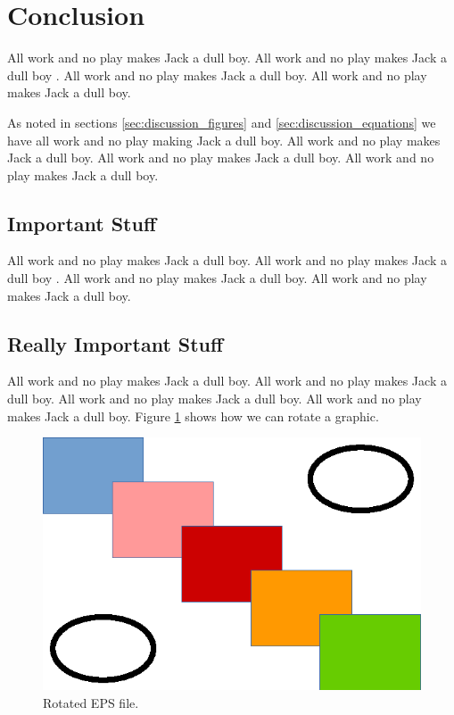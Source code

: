 
%
%

%
%

\section{Conclusion}
\label{sec:conclusion}

All work and no play makes Jack a dull boy.
All work and no play makes Jack a dull boy \cite{knuth-website}.
All work and no play makes Jack a dull boy.
All work and no play makes Jack a dull boy.

As noted in sections
\ref{sec:discussion_figures} and
\ref{sec:discussion_equations}
we have all work and no play making Jack a dull boy.
All work and no play makes Jack a dull boy.
All work and no play makes Jack a dull boy.
All work and no play makes Jack a dull boy.

\subsection{Important Stuff}
\label{sec:conclusions_important_stuff}

All work and no play makes Jack a dull boy.
All work and no play makes Jack a dull boy
\cite{einstein-electrodynamics,
knuth-website,
knuth-fundamental-algorithms,
dirac-quantum-mechanics}.
All work and no play makes Jack a dull boy.
All work and no play makes Jack a dull boy.

\subsection{Really Important Stuff}
\label{sec:conclusions_really_important_stuff}

All work and no play makes Jack a dull boy.
All work and no play makes Jack a dull boy.
All work and no play makes Jack a dull boy.
All work and no play makes Jack a dull boy.
Figure \ref{fig:rotated_shapes} shows how we can rotate a graphic.

\begin{figure}[h]
\centering
\includegraphics[width=\linewidth, angle =90]{../figures/shapes.eps}
\caption{Rotated EPS file.}
\label{fig:rotated_shapes}
\end{figure}
